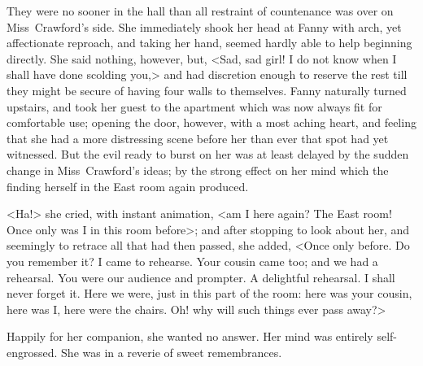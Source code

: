 They were no sooner in the hall than all restraint of countenance was over on Miss~Crawford's side. She immediately shook her head at Fanny with arch, yet affectionate reproach, and taking her hand, seemed hardly able to help beginning directly. She said nothing, however, but, <Sad, sad girl! I do not know when I shall have done scolding you,> and had discretion enough to reserve the rest till they might be secure of having four walls to themselves. Fanny naturally turned upstairs, and took her guest to the apartment which was now always fit for comfortable use; opening the door, however, with a most aching heart, and feeling that she had a more distressing scene before her than ever that spot had yet witnessed. But the evil ready to burst on her was at least delayed by the sudden change in Miss~Crawford's ideas; by the strong effect on her mind which the finding herself in the East room again produced.

<Ha!> she cried, with instant animation, <am I here again? The East room! Once only was I in this room before>; and after stopping to look about her, and seemingly to retrace all that had then passed, she added, <Once only before. Do you remember it? I came to rehearse. Your cousin came too; and we had a rehearsal. You were our audience and prompter. A delightful rehearsal. I shall never forget it. Here we were, just in this part of the room: here was your cousin, here was I, here were the chairs. Oh! why will such things ever pass away?>

Happily for her companion, she wanted no answer. Her mind was entirely self-engrossed. She was in a reverie of sweet remembrances.

